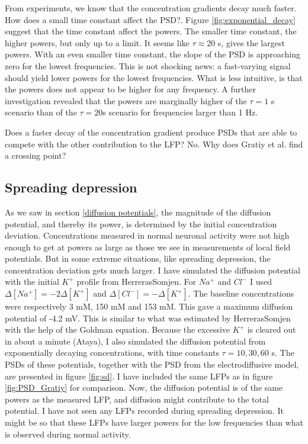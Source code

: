 \documentclass{article}
\begin{document}
From experiments, we know that the concentration gradients decay much faster. How does a small time constant affect the PSD?. Figure \ref{fig:exponential_decay} suggest that the time constant affect the powers. The smaller time constant, the higher powers, but only up to a limit. It seems like $\tau \approx 20 $ s, gives the largest powers. With an even smaller time constant, the slope of the PSD is approaching zero for the lowest frequencies. This is not shocking news: a fast-varying signal should yield lower powers for the lowest frequencies. What is less intuitive, is that the powers does not appear to be higher for any frequency. A further investigation revealed that the powers are marginally higher of the $\tau = 1$ s scenario than of the $\tau = 20 $s scenario for frequencies larger than 1 Hz.

Does a faster decay of the concentration gradient produce PSDs that are able to compete with the other contribution to the LFP? No. Why does Gratiy et al. find a crossing point? 

\subsection{Spreading depression}

As we saw in section \ref{diffusion potentials}, the magnitude of the diffusion potential, and thereby its power, is determined by the initial concentration deviation. Concentrations measured in normal neuronal activity were not high enough to get at powers as large as those we see in measurements of local field potentials. But in some extreme situations, like spreading depression, the concentration deviation gets much larger. I have simulated the diffusion potential with the initial $K^+$ profile from HerrerasSomjen. For $Na^+$ and $Cl^-$ I used $\Delta [Na^+] = -2\Delta [K^+]$ and $\Delta [Cl^-] = -\Delta[K^+]$. The baseline concentrations were respectively 3 mM, 150 mM and 153 mM. This gave a maximum diffusion potential of -4.2 mV. This is similar to what was estimated by HerrerasSomjen with the help of the Goldman equation. Because the excessive $K^+$ is cleared out in about a minute (Ataya), I also simulated the diffusion potential from exponentially decaying concentrations, with time constants $\tau = 10, 30, 60 $ s. The PSDs of these potentials, together with the PSD from the electrodiffusive model, are presented in figure \ref{fig:sd}. I have included the same LFPs as in figure \ref{fig:PSD_Gratiy} for comparison. 
Now, the diffusion potential is of the same powers as the measured  LFP, and diffusion might contribute to the total potential. I have not seen any LFPs recorded during spreading depression. It might be so that these LFPs have larger powers for the low frequencies than what is observed during normal activity. 
\end{document}
